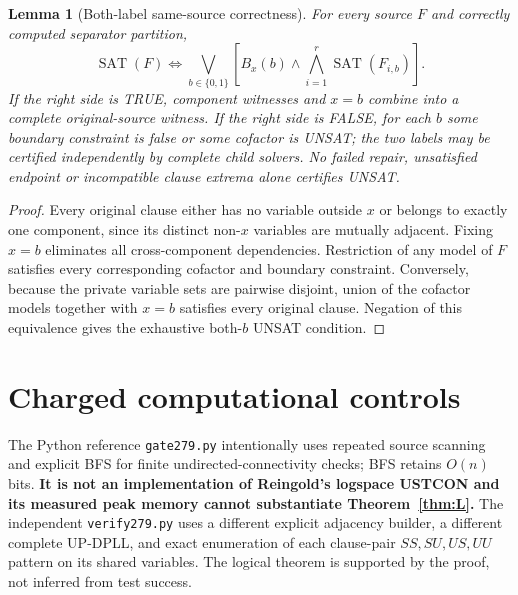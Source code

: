 \documentclass[11pt]{article}
\newtheorem{lemma}[theorem]{Lemma}
\begin{document}
\begin{lemma}[Both-label same-source correctness]\label{lem:join}
For every source $F$ and correctly computed separator partition,
\[
\operatorname{SAT}(F)\iff\bigvee_{b\in\{0,1\}}\left[B_x(b)\land\bigwedge_{i=1}^r\operatorname{SAT}(F_{i,b})\right].
\]
If the right side is TRUE, component witnesses and $x=b$ combine into a complete original-source witness. If the right side is FALSE, for each $b$ some boundary constraint is false or some cofactor is UNSAT; the two labels may be certified independently by complete child solvers. No failed repair, unsatisfied endpoint or incompatible clause extrema alone certifies UNSAT.
\end{lemma}
\begin{proof}
Every original clause either has no variable outside $x$ or belongs to exactly one component, since its distinct non-$x$ variables are mutually adjacent. Fixing $x=b$ eliminates all cross-component dependencies. Restriction of any model of $F$ satisfies every corresponding cofactor and boundary constraint. Conversely, because the private variable sets are pairwise disjoint, union of the cofactor models together with $x=b$ satisfies every original clause. Negation of this equivalence gives the exhaustive both-$b$ UNSAT condition.\end{proof}

\section{Charged computational controls}
The Python reference \texttt{gate279.py} intentionally uses repeated source scanning and explicit BFS for finite undirected-connectivity checks; BFS retains $O(n)$ bits. \textbf{It is not an implementation of Reingold's logspace USTCON and its measured peak memory cannot substantiate Theorem~\ref{thm:L}.} The independent \texttt{verify279.py} uses a different explicit adjacency builder, a different complete UP-DPLL, and exact enumeration of each clause-pair $SS,SU,US,UU$ pattern on its shared variables. The logical theorem is supported by the proof, not inferred from test success.
\end{document}
